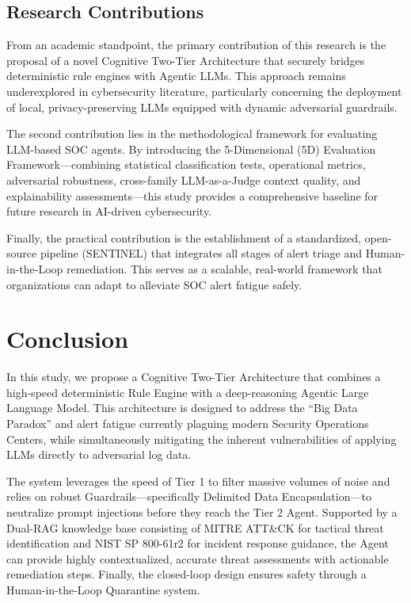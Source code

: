 \documentclass[12pt,a4paper]{article}
\begin{document}
\subsection{Research Contributions}
From an academic standpoint, the primary contribution of this research is the proposal of a novel Cognitive Two-Tier Architecture that securely bridges deterministic rule engines with Agentic LLMs. This approach remains underexplored in cybersecurity literature, particularly concerning the deployment of local, privacy-preserving LLMs equipped with dynamic adversarial guardrails.

The second contribution lies in the methodological framework for evaluating LLM-based SOC agents. By introducing the 5-Dimensional (5D) Evaluation Framework—combining statistical classification tests, operational metrics, adversarial robustness, cross-family LLM-as-a-Judge context quality, and explainability assessments—this study provides a comprehensive baseline for future research in AI-driven cybersecurity.

Finally, the practical contribution is the establishment of a standardized, open-source pipeline (SENTINEL) that integrates all stages of alert triage and Human-in-the-Loop remediation. This serves as a scalable, real-world framework that organizations can adapt to alleviate SOC alert fatigue safely.

\newpage
\section{Conclusion}
In this study, we propose a Cognitive Two-Tier Architecture that combines a high-speed deterministic Rule Engine with a deep-reasoning Agentic Large Language Model. This architecture is designed to address the ``Big Data Paradox'' and alert fatigue currently plaguing modern Security Operations Centers, while simultaneously mitigating the inherent vulnerabilities of applying LLMs directly to adversarial log data.

The system leverages the speed of Tier 1 to filter massive volumes of noise and relies on robust Guardrails—specifically Delimited Data Encapsulation—to neutralize prompt injections before they reach the Tier 2 Agent. Supported by a Dual-RAG knowledge base consisting of MITRE ATT\&CK for tactical threat identification and NIST SP 800-61r2 for incident response guidance, the Agent can provide highly contextualized, accurate threat assessments with actionable remediation steps. Finally, the closed-loop design ensures safety through a Human-in-the-Loop Quarantine system.
\end{document}
